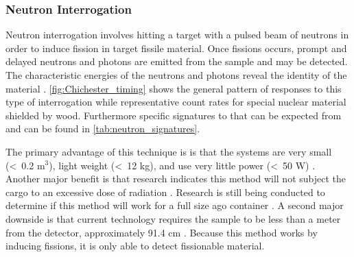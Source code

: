 \documentclass{report}
\begin{document}





\subsubsection{Neutron Interrogation}

Neutron interrogation involves hitting a target with a pulsed beam of neutrons in order to induce fission in target fissile material. Once fissions occurs, prompt and delayed neutrons and photons are emitted from the sample and may be detected. The characteristic energies of the neutrons and photons reveal the identity of the material \cite{Chichester2009}.  \autoref{fig:Chichester_timing}  shows the general pattern of responses to this type of interrogation while representative count rates for special nuclear material shielded by wood. Furthermore specific signatures to that can be expected from  and  can be found in \autoref{tab:neutron_signatures}.

The primary advantage of this technique is is that the systems are very small (\textless\ 0.2 m\(^3\)), light weight (\textless\ 12 kg), and use very little power (\textless\ 50 W) \cite{Chichester2009}.  Another major benefit is that research indicates this method will not subject the cargo to an excessive dose of radiation \cite{Hall2007}.  Research is still being conducted to determine if this method will work for a full size ago container \cite{Hall2007}.  A second major downside is that current technology requires the sample to be less than a meter from the detector, approximately 91.4 cm \cite{Hall2007}. Because this method works by inducing fissions, it is only able to detect fissionable material.
\end{document}
